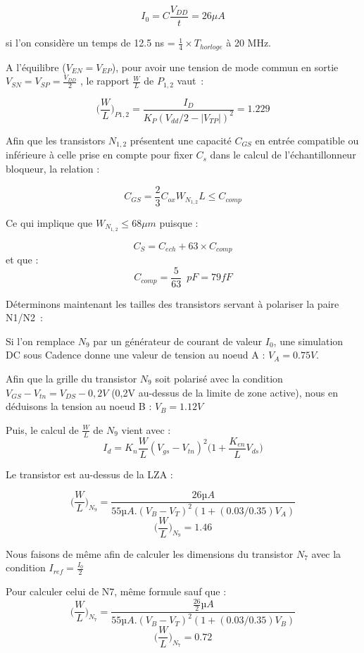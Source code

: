 \documentclass[11pt]{article}
\begin{document}
\[
I_0 = C \frac{V_{DD}}{t} = 26 \mu A
\]

si l'on consid\`ere un temps de 12.5 ns = $\frac{1}{4} \times T_{horloge}$ \`a 20 MHz.

A l'\'equilibre ($V_{EN} = V_{EP}$), pour avoir une tension de mode commun en sortie
$V_{SN} = V_{SP} = \frac{V_{DD}}{2}$ , le rapport $\frac{W}{L}$ de $P_{1,2}$ vaut :

\[
  \bigg(\frac{W}{L}\bigg)_{P1,2} = \frac{I_D}{K_P (V_{dd}/2 - |V_{TP}|)^{2}} = 1.229
\]

Afin que les transistors $N_{1,2}$ pr\'esentent une capacit\'e $C_{GS}$ en entr\'ee compatible
ou inf\'erieure \`a celle prise en compte pour fixer $C_s$ dans le calcul de l'\'echantillonneur
bloqueur, la relation :

\[
  C_{GS} = \frac{2}{3} C_{ox} W_{N_{1,2}} L \leq C_{comp}
\]

Ce qui implique que $W_{N_{1,2}} \leq 68 \mu m$ puisque :

\[
  C_S = C_{ech} + 63 \times C_{comp}
\]
et que :
\[
  C_{comp} = \frac{5}{63} \phantom{2} pF = 79 fF
\]

D\'eterminons maintenant les tailles des transistors servant \`a polariser la paire N1/N2 :

Si l'on remplace $N_{9}$ par un g\'en\'erateur de courant de valeur $I_{0}$, une simulation DC
sous Cadence donne une valeur de tension au noeud A : $V_A = 0.75 V$.

Afin que la grille du transistor $N_9$ soit polaris\'e avec la condition $V_{GS}-V_{tn}=V_{DS} - 0,2V$
 (0,2V au-dessus de la limite de zone active), nous en d\'eduisons la tension au noeud B : $V_B = 1.12 V$

Puis, le calcul de $\frac{W}{L}$ de $N_9$ vient avec :
\[
  I_d = K_n \frac{W}{L} (V_{gs} - V_{tn})^2 \bigg( 1 + \frac{K_{en}}{L} V_{ds}\bigg)
\]

Le transistor est au-dessus de la LZA :

\[
\bigg(\frac{W}{L} \bigg)_{N_9} = \frac {26µA}{55µA . (V_B - V_T)^2 ( 1+ (0.03/0.35) V_A)}
\]
\[
\bigg(\frac{W}{L} \bigg)_{N_9} = 1.46
\]

Nous faisons de m\^eme afin de calculer les dimensions du transistor $N_7$ avec la condition
$I_{ref} =\frac{I_0}{2}$

Pour calculer celui de N7, m\^eme formule sauf que :
\[
  \bigg(\frac{W}{L} \bigg)_{N_7} = \frac {\frac{26}{2}µA  }{55µA . (V_B - V_T)^2 ( 1+ (0.03/0.35) V_B)}
\]
\[
\bigg(\frac{W}{L} \bigg)_{N_7} = 0.72
\]
\end{document}
